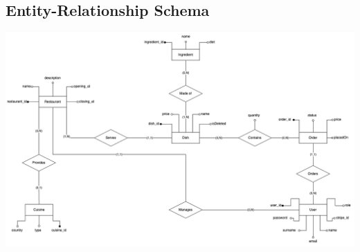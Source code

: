 \subsection{Entity-Relationship Schema}


\includegraphics[width=1.0\textwidth]{resources/ER-diagram.png}




